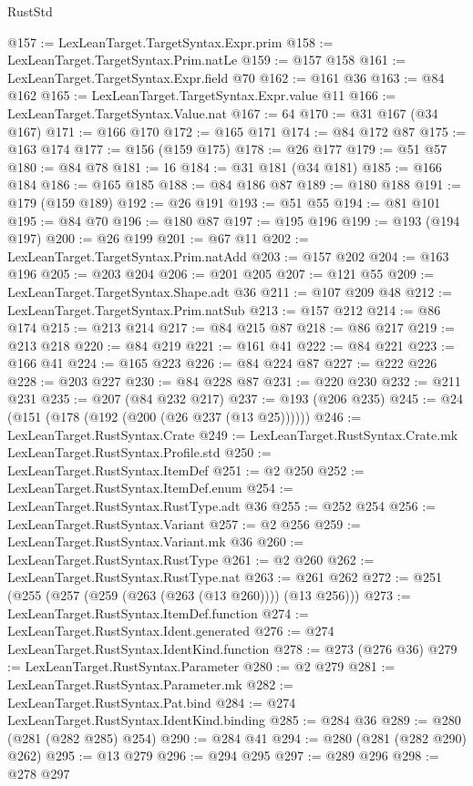 \begin{lexlean}{RustStd}
\begin{coremodule}
@157 := LexLeanTarget.TargetSyntax.Expr.prim
@158 := LexLeanTarget.TargetSyntax.Prim.natLe
@159 := @157 @158
@161 := LexLeanTarget.TargetSyntax.Expr.field @70
@162 := @161 @36
@163 := @84 @162
@165 := LexLeanTarget.TargetSyntax.Expr.value @11
@166 := LexLeanTarget.TargetSyntax.Value.nat
@167 := 64
@170 := @31 @167 (@34 @167)
@171 := @166 @170
@172 := @165 @171
@174 := @84 @172 @87
@175 := @163 @174
@177 := @156 (@159 @175)
@178 := @26 @177
@179 := @51 @57
@180 := @84 @78
@181 := 16
@184 := @31 @181 (@34 @181)
@185 := @166 @184
@186 := @165 @185
@188 := @84 @186 @87
@189 := @180 @188
@191 := @179 (@159 @189)
@192 := @26 @191
@193 := @51 @55
@194 := @81 @101
@195 := @84 @70
@196 := @180 @87
@197 := @195 @196
@199 := @193 (@194 @197)
@200 := @26 @199
@201 := @67 @11
@202 := LexLeanTarget.TargetSyntax.Prim.natAdd
@203 := @157 @202
@204 := @163 @196
@205 := @203 @204
@206 := @201 @205
@207 := @121 @55
@209 := LexLeanTarget.TargetSyntax.Shape.adt @36
@211 := @107 @209 @48
@212 := LexLeanTarget.TargetSyntax.Prim.natSub
@213 := @157 @212
@214 := @86 @174
@215 := @213 @214
@217 := @84 @215 @87
@218 := @86 @217
@219 := @213 @218
@220 := @84 @219
@221 := @161 @41
@222 := @84 @221
@223 := @166 @41
@224 := @165 @223
@226 := @84 @224 @87
@227 := @222 @226
@228 := @203 @227
@230 := @84 @228 @87
@231 := @220 @230
@232 := @211 @231
@235 := @207 (@84 @232 @217)
@237 := @193 (@206 @235)
@245 := @24 (@151 (@178 (@192 (@200 (@26 @237 (@13 @25))))))
@246 := LexLeanTarget.RustSyntax.Crate
@249 := LexLeanTarget.RustSyntax.Crate.mk LexLeanTarget.RustSyntax.Profile.std
@250 := LexLeanTarget.RustSyntax.ItemDef
@251 := @2 @250
@252 := LexLeanTarget.RustSyntax.ItemDef.enum
@254 := LexLeanTarget.RustSyntax.RustType.adt @36
@255 := @252 @254
@256 := LexLeanTarget.RustSyntax.Variant
@257 := @2 @256
@259 := LexLeanTarget.RustSyntax.Variant.mk @36
@260 := LexLeanTarget.RustSyntax.RustType
@261 := @2 @260
@262 := LexLeanTarget.RustSyntax.RustType.nat
@263 := @261 @262
@272 := @251 (@255 (@257 (@259 (@263 (@263 (@13 @260)))) (@13 @256)))
@273 := LexLeanTarget.RustSyntax.ItemDef.function
@274 := LexLeanTarget.RustSyntax.Ident.generated
@276 := @274 LexLeanTarget.RustSyntax.IdentKind.function
@278 := @273 (@276 @36)
@279 := LexLeanTarget.RustSyntax.Parameter
@280 := @2 @279
@281 := LexLeanTarget.RustSyntax.Parameter.mk
@282 := LexLeanTarget.RustSyntax.Pat.bind
@284 := @274 LexLeanTarget.RustSyntax.IdentKind.binding
@285 := @284 @36
@289 := @280 (@281 (@282 @285) @254)
@290 := @284 @41
@294 := @280 (@281 (@282 @290) @262)
@295 := @13 @279
@296 := @294 @295
@297 := @289 @296
@298 := @278 @297

\end{coremodule}
\end{lexlean}
